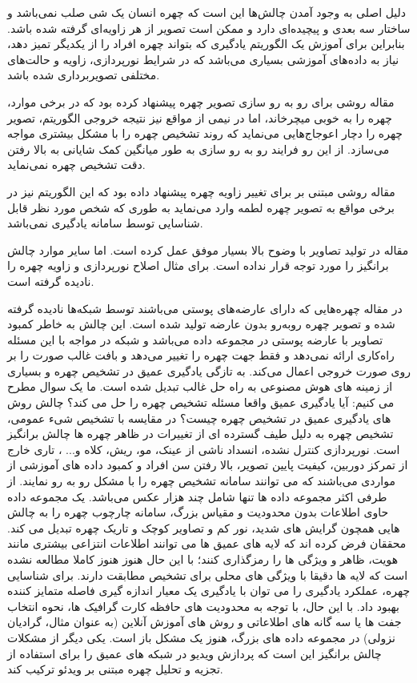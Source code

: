 \noindent
دلیل اصلی به وجود آمدن چالش‌ها این است که چهره انسان یک شی صلب نمی‌باشد و ساختار سه بعدی و پیچیده‌ای دارد و ممکن است تصویر از هر زاویه‌ای گرفته شده باشد. بنابراین برای آموزش یک الگوریتم یادگیری که بتواند چهره افراد را از یکدیگر تمیز دهد، نیاز به داده‌های آموزشی بسیاری می‌باشد که در شرایط نورپردازی، زاویه و حالت‌های مختلفی تصویربرداری شده باشد.

\noindent
مقاله \cite{HAGHIGHAT201623} روشی برای رو به رو سازی تصویر چهره پیشنهاد کرده بود که در برخی موارد، چهره را به خوبی میچرخاند، اما در نیمی از مواقع نیز نتیجه خروجی الگوریتم، تصویر چهره را دچار اعوجاج‌هایی می‌نماید که روند تشخیص چهره را با مشکل بیشتری مواجه می‌سازد. از این رو فرایند رو به رو سازی به طور میانگین کمک شایانی به بالا رفتن دقت تشخیص چهره نمی‌نماید.

\noindent
مقاله \cite{radford2016unsupervised} روشی مبتنی بر  برای تغییر زاویه چهره پیشنهاد داده بود که این الگوریتم نیز در برخی مواقع به تصویر چهره لطمه وارد می‌نماید به طوری که شخص مورد نظر قابل شناسایی توسط سامانه یادگیری نمی‌باشد.

\noindent
مقاله  \cite{BANERJEE2018246} در تولید تصاویر با وضوح بالا بسیار موفق عمل کرده است. اما سایر موارد چالش برانگیز را مورد توجه قرار نداده است. برای مثال اصلاح نورپردازی و زاویه چهره را نادیده گرفته است.

\noindent
در مقاله \cite{8603840} چهره‌هایی که دارای عارضه‌های پوستی می‌باشند توسط شبکه‌ها نادیده گرفته شده و تصویر چهره روبه‌رو بدون عارضه تولید شده است. این چالش به خاطر کمبود تصاویر با عارضه پوستی در مجموعه داده می‌باشد و شبکه در مواجه با این مسئله راه‌کاری ارائه نمی‌دهد و فقط جهت چهره را تغییر می‌دهد و بافت غالب صورت را بر روی صورت خروجی اعمال می‌کند.
\noindent
به تازگی یادگیری عمیق در تشخیص چهره و بسیاری از زمینه های هوش مصنوعی به راه حل غالب تبدیل شده است. ما یک سوال مطرح می کنیم: آیا یادگیری عمیق واقعا مسئله تشخیص چهره را حل می کند؟ چالش روش های یادگیری عمیق در تشخیص چهره چیست؟ 
\noindent
در مقایسه با تشخیص شیء عمومی، تشخیص چهره به دلیل طیف گسترده ای از تغییرات در ظاهر چهره ها چالش برانگیز است. نورپردازی کنترل نشده، انسداد ناشی از عینک، مو، ریش، کلاه و... ، تاری خارج از تمرکز دوربین، کیفیت پایین تصویر، بالا رفتن سن افراد و کمبود داده های آموزشی از مواردی می‌باشند که می توانند سامانه تشخیص چهره را با مشکل رو به رو نمایند.
\noindent
از طرفی اکثر مجموعه داده ها تنها شامل چند هزار عکس می‌باشد. یک مجموعه داده حاوی اطلاعات بدون محدودیت و مقیاس بزرگ، سامانه چارچوب چهره را به چالش هایی همچون گرایش های شدید، نور کم و تصاویر کوچک و تاریک چهره تبدیل می کند. محققان فرض کرده اند که لایه های عمیق  ها می توانند اطلاعات انتزاعی بیشتری مانند هویت، ظاهر و ویژگی ها را رمزگذاری کنند؛ با این حال هنوز هنوز کاملا مطالعه نشده است که لایه ها دقیقا با ویژگی های محلی برای تشخیص مطابقت دارند.
\noindent
برای شناسایی چهره، عملکرد یادگیری را می توان با یادگیری یک معیار اندازه گیری فاصله متمایز کننده بهبود داد. با این حال، با توجه به محدودیت های حافظه کارت گرافیک ها، نحوه انتخاب جفت ها یا سه گانه های اطلاعاتی و روش های آموزش آنلاین (به عنوان مثال، گرادیان نزولی) در مجموعه داده های بزرگ، هنوز یک مشکل باز است. یکی دیگر از مشکلات چالش برانگیز این است که پردازش ویدیو در شبکه های عمیق را برای استفاده از تجزیه و تحلیل چهره مبتنی بر ویدئو ترکیب کند.
